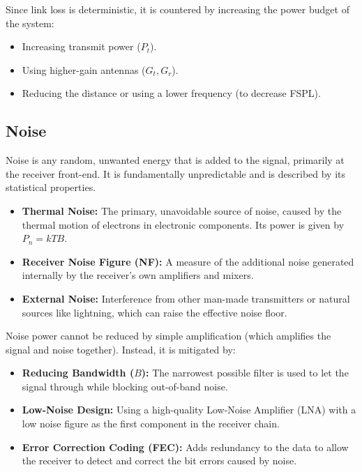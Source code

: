 Since link loss is deterministic, it is countered by increasing the power budget of the system:
\begin{itemize}
    \item Increasing transmit power ($P_t$).
    \item Using higher-gain antennas ($G_t, G_r$).
    \item Reducing the distance or using a lower frequency (to decrease FSPL).
\end{itemize}


\subsection{Noise}

Noise is any random, unwanted energy that is added to the signal, primarily at the receiver front-end. It is fundamentally unpredictable and is described by its statistical properties.

\begin{itemize}
    \item \textbf{Thermal Noise:} The primary, unavoidable source of noise, caused by the thermal motion of electrons in electronic components. Its power is given by $P_n = kTB$.
    \item \textbf{Receiver Noise Figure (NF):} A measure of the additional noise generated internally by the receiver's own amplifiers and mixers.
    \item \textbf{External Noise:} Interference from other man-made transmitters or natural sources like lightning, which can raise the effective noise floor.
\end{itemize}

Noise power cannot be reduced by simple amplification (which amplifies the signal and noise together). Instead, it is mitigated by:
\begin{itemize}
    \item \textbf{Reducing Bandwidth ($B$):} The narrowest possible filter is used to let the signal through while blocking out-of-band noise.
    \item \textbf{Low-Noise Design:} Using a high-quality Low-Noise Amplifier (LNA) with a low noise figure as the first component in the receiver chain.
    \item \textbf{Error Correction Coding (FEC):} Adds redundancy to the data to allow the receiver to detect and correct the bit errors caused by noise.
\end{itemize}


